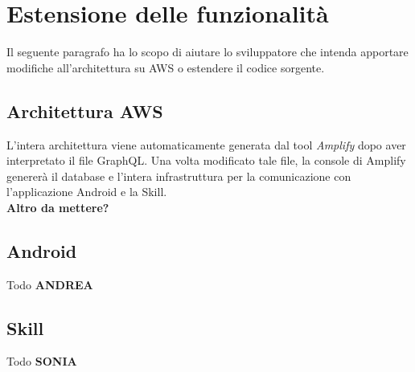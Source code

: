 \clearpage

\section{Estensione delle funzionalità}

Il seguente paragrafo ha lo scopo di aiutare lo sviluppatore che intenda apportare modifiche all'architettura su AWS o estendere il codice sorgente.

\subsection{Architettura AWS}

L'intera architettura viene automaticamente generata dal tool \emph{Amplify} dopo aver interpretato il file GraphQL. Una volta modificato tale file, la console di Amplify genererà il database e l'intera infrastruttura per la comunicazione con l'applicazione Android e la Skill.\\[0.25cm]

\textbf{Altro da mettere?}

\subsection{Android}

Todo \textbf{ANDREA}

\subsection{Skill}

Todo \textbf{SONIA}
